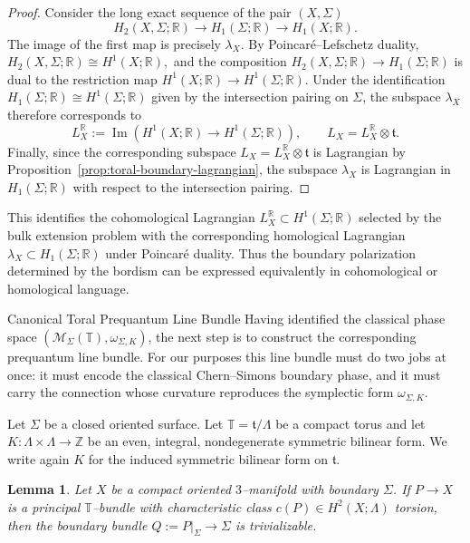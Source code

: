 \documentclass[12pt]{amsart}
\makeatletter
\renewcommand\subsection{\@startsection{subsection}{2}%
  \z@{.5\linespacing\@plus.7\linespacing}{-.5em}%
  {\normalfont\bfseries}}
\numberwithin{equation}{section}
\newtheorem{lemma}[theorem]{Lemma}
\makeatother
\begin{document}
\begin{proof}
Consider the long exact sequence of the pair $(X,\Sigma)$
\[
H_2(X,\Sigma;\mathbb{R}) \longrightarrow H_1(\Sigma;\mathbb{R})
\longrightarrow H_1(X;\mathbb{R}).
\]
The image of the first map is precisely $\lambda_X$. By Poincaré–Lefschetz duality, $H_2(X,\Sigma;\mathbb{R}) \cong H^1(X;\mathbb{R}),$ and the composition $H_2(X,\Sigma;\mathbb{R}) \to H_1(\Sigma;\mathbb{R})$ is dual to the restriction map $H^1(X;\mathbb{R}) \to H^1(\Sigma;\mathbb{R}).$ Under the identification $H_1(\Sigma;\mathbb{R}) \cong H^1(\Sigma;\mathbb{R})$ given by the intersection pairing on $\Sigma$, the subspace $\lambda_X$ therefore corresponds to
\[
L_X^{\mathbb R} := \operatorname{Im}\!\left(H^1(X;\mathbb R) \longrightarrow H^1(\Sigma;\mathbb R)\right), \qquad L_X=L_X^{\mathbb R}\otimes\mathfrak t.
\]
Finally, since the corresponding subspace $L_X=L_X^{\mathbb R}\otimes \mathfrak t$ is Lagrangian by Proposition~\ref{prop:toral-boundary-lagrangian}, the subspace $\lambda_X$ is Lagrangian in $H_1(\Sigma;\mathbb{R})$ with respect to the intersection pairing.
\end{proof}


This identifies the cohomological Lagrangian \(L_X^{\mathbb R}\subset H^1(\Sigma;\mathbb R)\) selected by the bulk extension problem with the corresponding homological Lagrangian \(\lambda_X\subset H_1(\Sigma;\mathbb R)\) under Poincaré duality. Thus the boundary polarization determined by the bordism can be expressed equivalently in cohomological or homological language.

\subsection{Canonical Toral Prequantum Line Bundle}
Having identified the classical phase space
\((\mathcal M_\Sigma(\mathbb T),\omega_{\Sigma,K})\), the next step is to
construct the corresponding prequantum line bundle. For our purposes this line
bundle must do two jobs at once: it must encode the classical Chern--Simons
boundary phase, and it must carry the connection whose curvature reproduces the
symplectic form \(\omega_{\Sigma,K}\).


Let $\Sigma$ be a closed oriented surface. Let $\mathbb T=\mathfrak t/\Lambda$ be a compact
torus and let $K:\Lambda\times\Lambda\to \mathbb Z$ be an even, integral, nondegenerate symmetric bilinear form.
We write again $K$ for the induced symmetric bilinear form on $\mathfrak t$.

\begin{lemma}
\label{lem:boundary-triviality-toral}
Let $X$ be a compact oriented $3$--manifold with boundary $\Sigma$.
If $P\to X$ is a principal $\mathbb T$--bundle with characteristic class
$c(P)\in H^2(X;\Lambda)$ torsion, then the boundary bundle
$Q:=P|_\Sigma\to \Sigma$ is trivializable.
\end{lemma}
\end{document}
